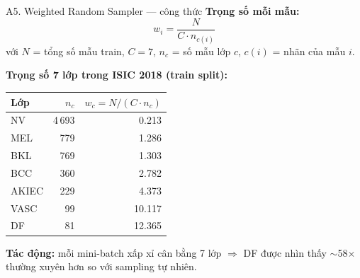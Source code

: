 \documentclass[10pt, aspectratio=169]{beamer}
\begin{document}
\begin{frame}{A5. Weighted Random Sampler --- công thức}
    \footnotesize
    \textbf{Trọng số mỗi mẫu:}
    \[
        w_i = \frac{N}{C \cdot n_{c(i)}}
    \]
    với $N$ = tổng số mẫu train, $C = 7$, $n_c$ = số mẫu lớp $c$, $c(i)$ = nhãn của mẫu $i$.

    \vspace{0.2cm}
    \textbf{Trọng số 7 lớp trong ISIC 2018 (train split):}
    \begin{table}[]
        \scriptsize \centering
        \begin{tabular}{lrr}
        \toprule
        \rowcolor{usthblue!25} \textbf{Lớp} & $n_c$ & $w_c = N/(C\cdot n_c)$ \\
        \midrule
        NV    & 4\,693 & 0.213 \\
        MEL   &   779  & 1.286 \\
        BKL   &   769  & 1.303 \\
        BCC   &   360  & 2.782 \\
        AKIEC &   229  & 4.373 \\
        VASC  &    99  & 10.117 \\
        DF    &    81  & 12.365 \\
        \bottomrule
        \end{tabular}
    \end{table}

    \textbf{Tác động:} mỗi mini-batch xấp xỉ cân bằng 7 lớp $\Rightarrow$ DF được nhìn thấy $\sim$58$\times$ thường xuyên hơn so với sampling tự nhiên.
\end{frame}
\end{document}
